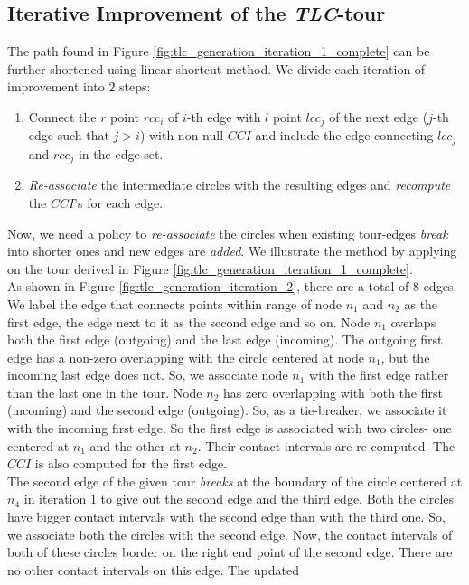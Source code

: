 \documentclass{llncs}
\begin{document}
\subsection{Iterative Improvement of the \textit{TLC}-tour}   
The path found in Figure \ref{fig:tlc_generation_iteration_1_complete} can be further shortened
using linear shortcut method. We divide each iteration
of improvement into $2$ steps:
\begin{enumerate} \itemsep0pt \parskip0pt 
  \item Connect the $r$ point $rcc_i$ of $i$-th edge with $l$ point $lcc_j$ of
  the next edge ($j$-th edge such that $j>i$) with non-null $CCI$ and include the edge 
  connecting $lcc_j$ and
  $rcc_j$ in the edge set.
  \item \textit{Re-associate} the intermediate circles with the resulting edges and
  \textit{recompute} the $CCI$'s for each edge.
\end{enumerate}
Now, we need a policy to \textit{re-associate}
the circles when existing tour-edges \textit{break} into shorter ones and new edges are
\textit{added}.
We illustrate the method by applying on the tour derived in Figure
\ref{fig:tlc_generation_iteration_1_complete}.\\
As shown in Figure \ref{fig:tlc_generation_iteration_2}, there are a total of $8$ edges. We label
the edge that connects points within range of node $n_1$ and $n_2$ as the first edge, the edge next
to it as the second edge and so on. Node $n_1$ overlaps both the first edge (outgoing) and the last
edge (incoming). The outgoing first edge has a non-zero overlapping with the circle centered at node
$n_1$, but the incoming last edge does not. So, we associate node $n_1$ with the first edge rather
than the last one in the tour. Node $n_2$ has zero overlapping with both the first (incoming) and
the second edge (outgoing). So, as a tie-breaker, we associate it with the incoming first edge. So
the first edge is associated with two circles- one centered at $n_1$ and the other at $n_2$. Their
contact intervals are re-computed. The $CCI$ is also computed for the first
edge. \\
The second edge of the given tour \textit{breaks} at the boundary
of the circle centered at $n_4$ in iteration 1 to give out the second edge and the third edge. Both
the circles have bigger contact intervals with the second edge than with the third one. So, we associate both
 the
circles with the second edge. Now, the contact intervals of both of these circles border on the
right end point of the second edge. There are no other contact intervals on this edge. The updated
\end{document}
